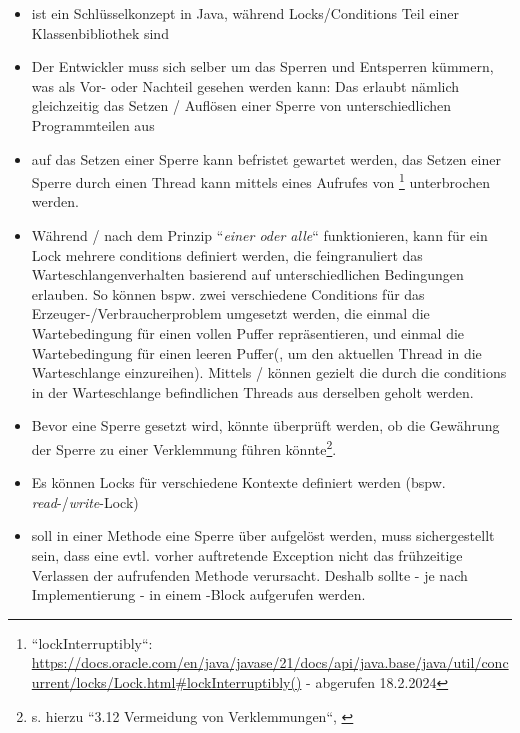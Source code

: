 \begin{tcolorbox}[title={Vor- und Nachteile von locks u. conditions}]
\begin{itemize}
    \item {} ist ein Schlüsselkonzept in Java, während Locks/Conditions Teil einer Klassenbibliothek sind
    \item Der Entwickler muss sich selber um das Sperren und Entsperren kümmern, was als Vor- oder Nachteil gesehen werden kann:
    Das erlaubt nämlich gleichzeitig das Setzen / Auflösen einer Sperre von unterschiedlichen Programmteilen aus
    \item auf das Setzen einer Sperre kann befristet gewartet werden, das Setzen einer Sperre durch einen Thread kann mittels eines Aufrufes von \footnote{
        ``lockInterruptibly``: \url{https://docs.oracle.com/en/java/javase/21/docs/api/java.base/java/util/concurrent/locks/Lock.html#lockInterruptibly()} - abgerufen 18.2.2024
    } unterbrochen werden.
    \item Während / nach dem Prinzip ``\textit{einer oder alle}`` funktionieren, kann für ein Lock mehrere conditions definiert werden, die feingranuliert das Warteschlangenverhalten basierend auf unterschiedlichen Bedingungen erlauben.
     So können bspw. zwei verschiedene Conditions für das Erzeuger-/Verbraucherproblem umgesetzt werden, die einmal die Wartebedingung für einen vollen Puffer repräsentieren, und einmal die Wartebedingung für einen leeren Puffer(, um den aktuellen Thread in die Warteschlange einzureihen).
     Mittels  /  können gezielt die durch die conditions in der Warteschlange befindlichen Threads aus derselben geholt werden.
    \item Bevor eine Sperre gesetzt wird, könnte überprüft werden, ob die Gewährung der Sperre zu einer Verklemmung führen könnte\footnote{s. hierzu ``3.12 Vermeidung von Verklemmungen``, \cite[192 ff.]{Oec22}}.
    \item Es können Locks für verschiedene Kontexte definiert werden (bspw. \textit{read}-/\textit{write}-Lock)
    \item soll in einer Methode eine Sperre über  aufgelöst werden, muss sichergestellt sein, dass eine evtl. vorher auftretende Exception nicht das frühzeitige Verlassen der aufrufenden Methode verursacht.
    Deshalb sollte  - je nach Implementierung - in einem -Block aufgerufen werden.
\end{itemize}
\end{tcolorbox}

